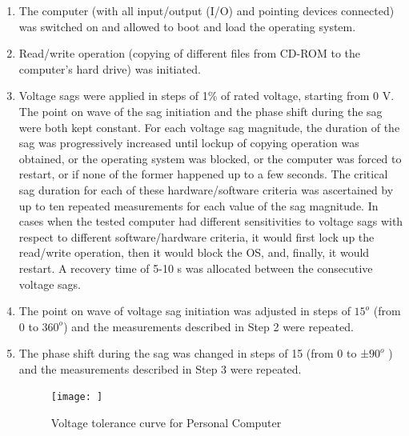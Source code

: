 \documentclass[17pt, a4paper]{extreport}
\begin{document}
\begin{enumerate}
    \item The computer (with all input/output (I/O) and pointing devices connected) was switched on and allowed to boot and load the operating system.
    
    \item Read/write operation (copying of different files from CD-ROM to the computer’s hard drive) was initiated.
    
    \item Voltage sags were applied in steps of 1\% of rated voltage, starting from 0 V. The point on wave of the sag initiation and the phase shift during the sag were both kept constant. For each voltage sag magnitude, the duration of the sag was progressively increased until lockup of copying operation was obtained, or the operating system was blocked, or the computer was forced to restart, or if none of the former happened up to a few seconds. The critical sag duration for each of these hardware/software criteria was ascertained by up to ten repeated measurements for each value of the sag magnitude. In cases when the tested computer had different sensitivities to voltage sags with respect to different software/hardware criteria, it would first lock up the read/write operation, then it would block the OS, and, finally, it would restart. A recovery time of 5-10 s was allocated between the consecutive voltage sags.
    
    \item The point on wave of voltage sag initiation was adjusted in steps of $15^{o}$ (from 0 to $360^{o}$) and the  measurements described in Step 2 were repeated.
 \item  The phase shift during the sag was changed in steps of 15 (from 0 to ±$90^{o}$ ) and the measurements described in Step 3 were repeated.
 
 \begin{figure}
     \centering
     \texttt{[image: ]}
     \caption{ Voltage tolerance curve for Personal Computer}
     \label{fig:PC_characteristics}
 \end{figure}
 

\end{enumerate}
\end{document}
